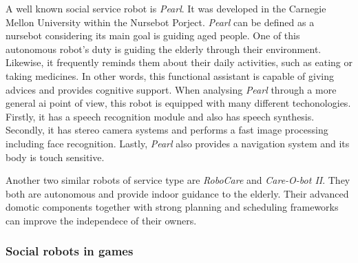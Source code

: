A well known social service robot is \emph{Pearl}.
It was developed in the Carnegie Mellon University within the Nursebot Porject.
\emph{Pearl} can be defined as a nursebot considering its main goal is guiding aged people.
One of this autonomous robot's duty is guiding the elderly through their environment.
Likewise, it frequently reminds them about their daily activities, such as eating or taking medicines.
In other words, this functional assistant is capable of giving advices and provides cognitive support.
When analysing \emph{Pearl} through a more general \gls{ai} point of view, this robot is equipped with many different techonologies.
Firstly, it has a speech recognition module and also has speech synthesis.
Secondly, it has stereo camera systems and performs a fast image processing including face recognition.
Lastly, \emph{Pearl} also provides a navigation system and its body is touch sensitive.

Another two similar robots of service type are \emph{RoboCare} and \emph{Care-O-bot II}.
They both are autonomous and provide indoor guidance to the elderly.
Their advanced domotic components together with strong planning and scheduling frameworks can improve the independece of their owners.



\subsubsection{Social robots in games}